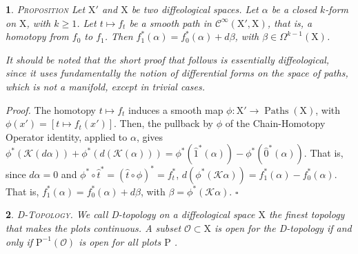 \documentclass[12pt,reqno]{amsart}
\theoremstyle{article}
\newtheorem{article}{}
\def\artlabel[#1]{\textsc{#1}.}
\renewenvironment{proof}{\noindent \textit{Proof.}} {\nolinebreak\hfill $\square$}
\def \P{\mathrm P}
\def \X{\mathrm X}
\newcommand{\cK}{{\mathcal K}}
\newcommand{\cO}{{\mathcal O}}
\newcommand{\Cinfty}{{\mathcal C}^{\infty}}
\DeclareMathOperator{\Paths}{Paths}
\begin{document}
\begin{article}
    \textsc{Proposition} \textit{Let $\X'$ and $\X$ be two diffeological spaces.
    Let $\alpha$ be a closed $k$-form on $\X$,
    with $k \geq 1$.
    Let $t \mapsto f_t$ be a smooth path in $\Cinfty(\X',\X)$,
    that is,
    a homotopy from $f_0$ to $f_1$.
    Then $f_1^*(\alpha) = f_0^*(\alpha) + d\beta$,
    with $\beta \in \Omega^{k-1}(\X)$.}
    
    It should be noted that the short proof that follows is essentially diffeological,
    since it uses fundamentally the notion of differential forms on the space of paths,
    which is not a manifold,
    except in trivial cases.
  \end{article}
  
  \begin{proof}
    The homotopy $t \mapsto f_t$ induces a smooth map $\phi \colon \X' \to \Paths(\X)$,
    with $\phi(x') = [t \mapsto f_t(x')]$.
    Then,
    the pullback by $\phi$ of the Chain-Homotopy Operator identity,
    applied to $\alpha$,
    gives $\phi^*(\cK(d\alpha)) + \phi^*(d(\cK(\alpha))) = \phi^*(\hat 1^*(\alpha)) - \phi^*(\hat 0^*(\alpha))$.
    That is,
    since $d\alpha = 0$ and $\phi^* \circ \hat t^* = (\hat t \circ \phi)^* = f_t^*$,
    $d(\phi^*(\cK\alpha)) = f_1^*(\alpha) - f_0^*(\alpha)$.
    That is,
    $f_1^*(\alpha) = f_0^*(\alpha) + d\beta$,
    with $\beta = \phi^*(\cK\alpha)$.
  \end{proof}
  
  \begin{article}\artlabel[D-Topology]
    {We call D-topology on a diffeological space $\X$ the finest topology that makes the plots continuous.
    A subset $\cO \subset \X$ is open for the D-topology if and only if $\P^{-1}(\cO)$ is open for all plots $\P$ \cite{Igl85}.}
  \end{article}
  
\end{document}

